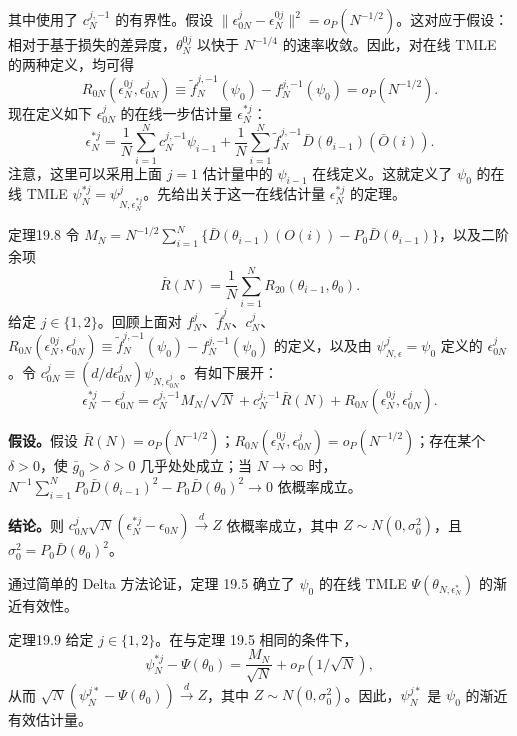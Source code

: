 其中使用了 $c_N^{j,-1}$ 的有界性。假设 $\|\epsilon_{0N}^j-\epsilon_N^{0j}\|^2=o_P(N^{-1/2})$。这对应于假设：相对于基于损失的差异度，$\theta_N^{0j}$ 以快于 $N^{-1/4}$ 的速率收敛。因此，对在线 TMLE 的两种定义，均可得
\[
 R_{0N}(\epsilon_N^{0j},\epsilon_{0N}^j)
 \equiv\tilde f_N^{j,-1}(\psi_0)-f_N^{j,-1}(\psi_0)=o_P(N^{-1/2}).
\]
现在定义如下 $\epsilon_{0N}^j$ 的在线一步估计量 $\epsilon_N^{*j}$：
\[
 \epsilon_N^{*j}=\frac1N\sum_{i=1}^N c_N^{j,-1}\psi_{i-1}
 +\frac1N\sum_{i=1}^N\tilde f_N^{j,-1}\bar D(\theta_{i-1})(\bar O(i)).
\]
注意，这里可以采用上面 $j=1$ 估计量中的 $\psi_{i-1}$ 在线定义。这就定义了 $\psi_0$ 的在线 TMLE $\psi_N^{*j}=\psi_{N,\epsilon_N^{*j}}^j$。先给出关于这一在线估计量 $\epsilon_N^{*j}$ 的定理。

\begin{bookresult}{定理}{19.8}
令 $M_N=N^{-1/2}\sum_{i=1}^N\{\bar D(\theta_{i-1})(O(i))-P_0\bar D(\theta_{i-1})\}$，以及二阶余项
\[
 \bar R(N)=\frac1N\sum_{i=1}^N R_{20}(\theta_{i-1},\theta_0).
\]
给定 $j\in\{1,2\}$。回顾上面对 $f_N^j$、$\tilde f_N^j$、$c_N^j$、$R_{0N}(\epsilon_N^{0j},\epsilon_{0N}^j)\equiv\tilde f_N^{j,-1}(\psi_0)-f_N^{j,-1}(\psi_0)$ 的定义，以及由 $\psi_{N,\epsilon}^j=\psi_0$ 定义的 $\epsilon_{0N}^j$。令 $c_{0N}^j\equiv({d}/{d\epsilon_{0N}^j})\psi_{N,\epsilon_{0N}^j}$。有如下展开：
\[
 \epsilon_N^{*j}-\epsilon_{0N}^j
 =c_N^{j,-1}M_N/\sqrt N+c_N^{j,-1}\bar R(N)
 +R_{0N}(\epsilon_N^{0j},\epsilon_{0N}^j).
\]

\textbf{假设。}假设 $\bar R(N)=o_P(N^{-1/2})$；$R_{0N}(\epsilon_N^{0j},\epsilon_{0N}^j)=o_P(N^{-1/2})$；存在某个 $\delta>0$，使 $\bar g_0>\delta>0$ 几乎处处成立；当 $N\to\infty$ 时，$N^{-1}\sum_{i=1}^N P_0\bar D(\theta_{i-1})^2-P_0\bar D(\theta_0)^2\to0$ 依概率成立。

\textbf{结论。}则 $c_{0N}^j\sqrt N(\epsilon_N^{*j}-\epsilon_{0N})\xrightarrow{d}Z$ 依概率成立，其中 $Z\sim N(0,\sigma_0^2)$，且 $\sigma_0^2=P_0\bar D(\theta_0)^2$。
\end{bookresult}

通过简单的 Delta 方法论证，定理 19.5 确立了 $\psi_0$ 的在线 TMLE $\Psi(\theta_{N,\epsilon_N^*})$ 的渐近有效性。

\begin{bookresult}{定理}{19.9}
给定 $j\in\{1,2\}$。在与定理 19.5 相同的条件下，
\[
 \psi_N^{*j}-\Psi(\theta_0)=\frac{M_N}{\sqrt N}+o_P(1/\sqrt N),
\]
从而 $\sqrt N(\psi_N^{j*}-\Psi(\theta_0))\xrightarrow{d}Z$，其中 $Z\sim N(0,\sigma_0^2)$。因此，$\psi_N^{j*}$ 是 $\psi_0$ 的渐近有效估计量。
\end{bookresult}

